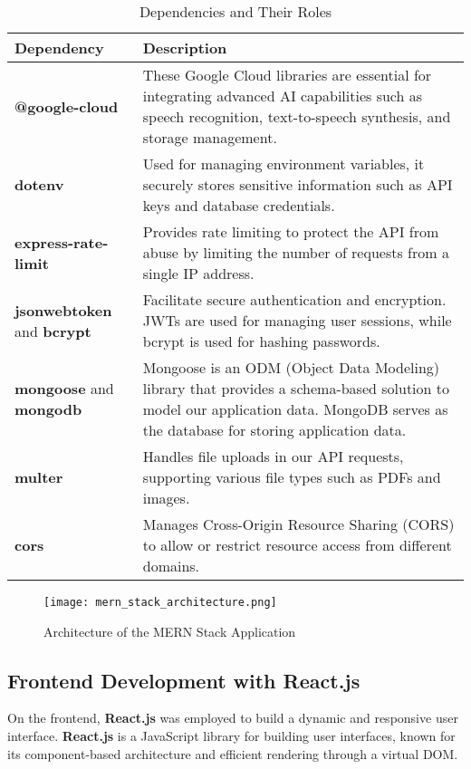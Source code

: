 \begin{table}[h!]
\centering
\begin{tabular}{|l|l|}
\hline
\textbf{Dependency} & \textbf{Description} \\
\hline
\textbf{@google-cloud} & These Google Cloud libraries are essential for integrating advanced AI capabilities such as speech recognition, text-to-speech synthesis, and storage management. \\
\hline
\textbf{dotenv} & Used for managing environment variables, it securely stores sensitive information such as API keys and database credentials. \\
\hline
\textbf{express-rate-limit} & Provides rate limiting to protect the API from abuse by limiting the number of requests from a single IP address. \\
\hline
\textbf{jsonwebtoken} and \textbf{bcrypt} & Facilitate secure authentication and encryption. JWTs are used for managing user sessions, while bcrypt is used for hashing passwords. \\
\hline
\textbf{mongoose} and \textbf{mongodb} & Mongoose is an ODM (Object Data Modeling) library that provides a schema-based solution to model our application data. MongoDB serves as the database for storing application data. \\
\hline
\textbf{multer} & Handles file uploads in our API requests, supporting various file types such as PDFs and images. \\
\hline
\textbf{cors} & Manages Cross-Origin Resource Sharing (CORS) to allow or restrict resource access from different domains. \\
\hline
\end{tabular}
\caption{Dependencies and Their Roles}
\label{table:dependencies}
\end{table}


\begin{figure}[h]
\centering
\texttt{[image: mern\_stack\_architecture.png]}
\caption{Architecture of the MERN Stack Application}
\label{fig:mern_architecture}
\end{figure}

\subsection{Frontend Development with React.js}

On the frontend, \textbf{React.js} was employed to build a dynamic and responsive user interface. \textbf{React.js} is a JavaScript library for building user interfaces, known for its component-based architecture and efficient rendering through a virtual DOM. 

